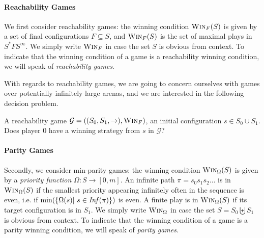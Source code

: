 \paragraph{Reachability Games}

We first consider reachability games: 
the winning condition $\textsc{Win}_F(S)$ is given by a set of final configurations
$F \subseteq S$, and $\textsc{Win}_F(S)$ is the set of maximal plays in $S^* F S^\infty$. 
We simply write
$\textsc{Win}_F$ in case the set $S$ is obvious from context.
To indicate that the winning condition of a game is a reachability winning condition, we will speak of {\em reachability games}. 


With regards to reachability games, we are going to concern ourselves with games over potentially infinitely large arenas, and we are interested in the following decision problem. \newline


\begin{samepage}
{A reachability game $\mathcal{G}= ((S_0, S_1,{\rightarrow}),\textsc{Win}_F)$, an initial configuration $s \in S_0 \cup S_1$.}
{Does player $0$ have a winning strategy from $s$ in $\mathcal{G}$?}
\end{samepage}





\paragraph{Parity Games}

Secondly, we consider min-parity games: 
the winning condition $\textsc{Win}_\Omega(S)$ is given by a {\em priority function} 
 $\Omega : S \to  [0, m]$.
An infinite path $ \pi = s_0 s_1 s_2 \ldots$ is in $\textsc{Win}_\Omega(S)$ if the smallest priority appearing infinitely often in
the sequence 
 is even, i.e.
if $\min( \{ \Omega(s) | ~ s \in \text{\textit{Inf}}( \pi) \})$ is even. 
A finite play is in $\textsc{Win}_\Omega(S)$ if its target configuration is in $S_1$.
We simply write
$\textsc{Win}_\Omega$ in case the set $S = S_0 \biguplus S_1$ is obvious from context.
To indicate that the winning condition of a game is a parity winning condition, we will speak of
 {\em parity games}. 


